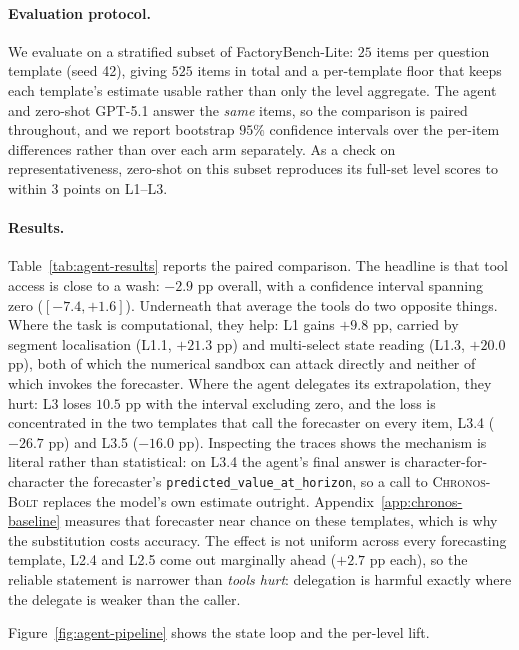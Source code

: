 \paragraph{Evaluation protocol.} We evaluate on a stratified subset of FactoryBench-Lite: $25$ items per question template (seed 42), giving $525$ items in total and a per-template floor that keeps each template's estimate usable rather than only the level aggregate. The agent and zero-shot GPT-5.1 answer the \emph{same} items, so the comparison is paired throughout, and we report bootstrap $95\%$ confidence intervals over the per-item differences rather than over each arm separately. As a check on representativeness, zero-shot on this subset reproduces its full-set level scores to within $3$ points on L1--L3.

\paragraph{Results.} Table~\ref{tab:agent-results} reports the paired comparison. The headline is that tool access is close to a wash: $-2.9$ pp overall, with a confidence interval spanning zero ($[-7.4, +1.6]$). Underneath that average the tools do two opposite things. Where the task is computational, they help: L1 gains $+9.8$ pp, carried by segment localisation (L1.1, $+21.3$ pp) and multi-select state reading (L1.3, $+20.0$ pp), both of which the numerical sandbox can attack directly and neither of which invokes the forecaster. Where the agent delegates its extrapolation, they hurt: L3 loses $10.5$ pp with the interval excluding zero, and the loss is concentrated in the two templates that call the forecaster on every item, L3.4 ($-26.7$ pp) and L3.5 ($-16.0$ pp). Inspecting the traces shows the mechanism is literal rather than statistical: on L3.4 the agent's final answer is character-for-character the forecaster's \texttt{predicted\_value\_at\_horizon}, so a call to \textsc{Chronos-Bolt} replaces the model's own estimate outright. Appendix~\ref{app:chronos-baseline} measures that forecaster near chance on these templates, which is why the substitution costs accuracy. The effect is not uniform across every forecasting template, L2.4 and L2.5 come out marginally ahead ($+2.7$ pp each), so the reliable statement is narrower than \emph{tools hurt}: delegation is harmful exactly where the delegate is weaker than the caller.

Figure~\ref{fig:agent-pipeline} shows the state loop and the per-level lift.

